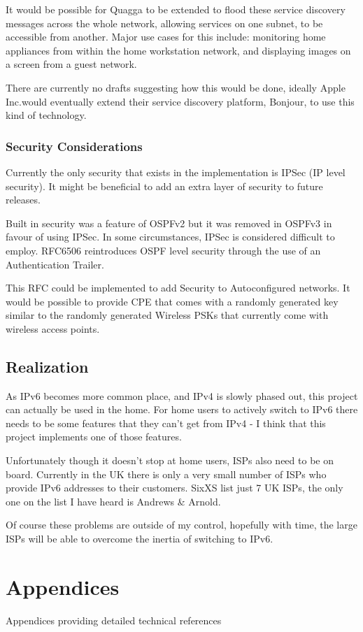 \documentclass[12pt]{report}
\begin{document}
It would be possible for Quagga to be extended to flood these service discovery
messages across the whole network, allowing services on one subnet, to be
accessible from another. Major use cases for this include: monitoring home
appliances from within the home workstation network, and displaying images on a
screen from a guest network.

There are currently no drafts suggesting how this would be done, ideally Apple
Inc.\@ would eventually extend their service discovery platform, Bonjour, to
use this kind of technology.

\subsection{Security Considerations}
Currently the only security that exists in the implementation is IPSec (IP
level security). It might be beneficial to add an extra layer of security to future 
releases.

Built in security was a feature of OSPFv2 but it was removed in OSPFv3 in favour of 
using IPSec. In some circumstances, IPSec is considered difficult to employ. 
RFC6506 reintroduces OSPF level security through the use of an Authentication 
Trailer. 

This RFC could be implemented to add Security to Autoconfigured networks. It would 
be possible to provide CPE that comes with a randomly generated key similar to the 
randomly generated Wireless PSKs that currently come with wireless access points.

\section{Realization}
As IPv6 becomes more common place, and IPv4 is slowly phased out, this project can 
actually be used in the home. For home users to actively switch to IPv6 there needs 
to be some features that they can't get from IPv4 - I think that this project 
implements one of those features.

Unfortunately though it doesn't stop at home users, ISPs also need to be on
board.  Currently in the UK there is only a very small number of ISPs who
provide IPv6 addresses to their customers. SixXS list just 7 UK ISPs, the only
one on the list I have heard is Andrews \& Arnold.

Of course these problems are outside of my control, hopefully with time, the
large ISPs will be able to overcome the inertia of switching to IPv6.
 
\pagebreak

\printnomenclature

\pagebreak

{}


\appendix 

\chapter{Appendices}
Appendices providing detailed technical references
\end{document}
